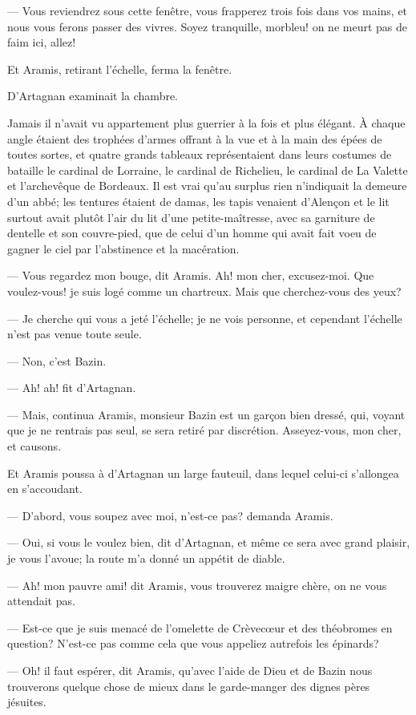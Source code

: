 — Vous reviendrez sous cette fenêtre, vous frapperez trois fois dans vos mains, et nous vous ferons passer des vivres. Soyez tranquille, morbleu! on ne meurt pas de faim ici, allez!

Et Aramis, retirant l'échelle, ferma la fenêtre.

D'Artagnan examinait la chambre.

Jamais il n'avait vu appartement plus guerrier à la fois et plus élégant. À chaque angle étaient des trophées d'armes offrant à la vue et à la main des épées de toutes sortes, et quatre grands tableaux représentaient dans leurs costumes de bataille le cardinal de Lorraine, le cardinal de Richelieu, le cardinal de La Valette et l'archevêque de Bordeaux. Il est vrai qu'au surplus rien n'indiquait la demeure d'un abbé; les tentures étaient de damas, les tapis venaient d'Alençon et le lit surtout avait plutôt l'air du lit d'une petite-maîtresse, avec sa garniture de dentelle et son couvre-pied, que de celui d'un homme qui avait fait voeu de gagner le ciel par l'abstinence et la macération.

— Vous regardez mon bouge, dit Aramis. Ah! mon cher, excusez-moi. Que voulez-vous! je suis logé comme un chartreux. Mais que cherchez-vous des yeux?

— Je cherche qui vous a jeté l'échelle; je ne vois personne, et cependant l'échelle n'est pas venue toute seule.

— Non, c'est Bazin.

— Ah! ah! fit d'Artagnan.

— Mais, continua Aramis, monsieur Bazin est un garçon bien dressé, qui, voyant que je ne rentrais pas seul, se sera retiré par discrétion. Asseyez-vous, mon cher, et causons.

Et Aramis poussa à d'Artagnan un large fauteuil, dans lequel celui-ci s'allongea en s'accoudant.

— D'abord, vous soupez avec moi, n'est-ce pas? demanda Aramis.

— Oui, si vous le voulez bien, dit d'Artagnan, et même ce sera avec grand plaisir, je vous l'avoue; la route m'a donné un appétit de diable.

— Ah! mon pauvre ami! dit Aramis, vous trouverez maigre chère, on ne vous attendait pas.

— Est-ce que je suis menacé de l'omelette de Crèvecœur et des théobromes en question? N'est-ce pas comme cela que vous appeliez autrefois les épinards?

— Oh! il faut espérer, dit Aramis, qu'avec l'aide de Dieu et de Bazin nous trouverons quelque chose de mieux dans le garde-manger des dignes pères jésuites.


